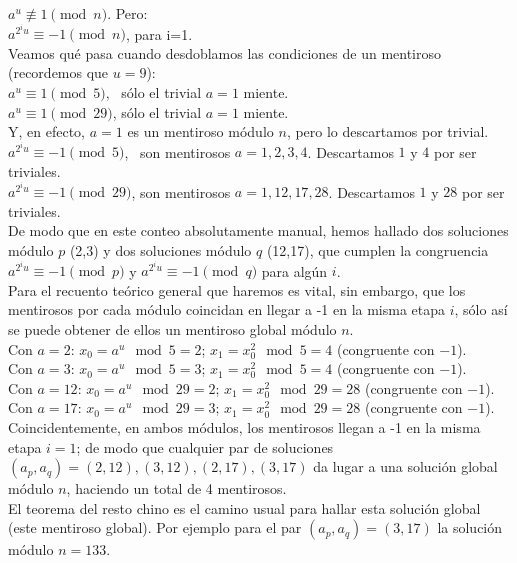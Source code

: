 \begin{ejemplo}
$a^u \nequiv 1 \pmod n$. Pero:\\
$a^{2^{i}u} \equiv -1 \pmod n$, para i=1. \\
Veamos qué pasa cuando desdoblamos las condiciones de un mentiroso (recordemos que $u=9$): \\
$a^u \equiv 1 \pmod 5$, \, sólo el trivial $a=1$ miente.\\
$a^u \equiv 1 \pmod {29}$, sólo el trivial $a=1$ miente.\\
Y, en efecto, $a=1$ es un mentiroso módulo $n$, pero lo descartamos por trivial. \\
$a^{2^{i}u} \equiv -1 \pmod 5$, \, son mentirosos $a=1,2,3,4$. Descartamos $1$ y $4$ por ser triviales.\\
$a^{2^{i}u} \equiv -1 \pmod {29}$, son mentirosos $a=1,12,17,28$. Descartamos $1$ y $28$ por ser triviales. \\
De modo que en este conteo absolutamente manual, hemos hallado dos soluciones módulo $p$ (2,3) y dos soluciones módulo $q$ (12,17), que cumplen la congruencia $a^{2^{i}u} \equiv -1 \pmod p$ y $a^{2^{i}u} \equiv -1 \pmod q$ para algún $i$. \\
Para el recuento teórico general que haremos es vital, sin embargo, que los mentirosos por cada módulo coincidan en llegar a -1 en la misma etapa $i$, sólo así se puede obtener de ellos un mentiroso global módulo $n$. \\
Con $a=2$: $x_0=a^u \mod 5= 2$; $x_1= x_0^2 \mod 5 = 4$ (congruente con $-1$). \\
Con $a=3$: $x_0=a^u \mod 5= 3$; $x_1= x_0^2 \mod 5 = 4$ (congruente con $-1$). \\
Con $a=12$: $x_0=a^u \mod 29= 2$; $x_1= x_0^2 \mod 29 = 28$ (congruente con $-1$). \\
Con $a=17$: $x_0=a^u \mod 29= 3$; $x_1= x_0^2 \mod 29 = 28$ (congruente con $-1$). \\
Coincidentemente, en ambos módulos, los mentirosos llegan a -1 en la misma etapa $i=1$; de modo que cualquier par de soluciones $(a_p,a_q)=(2,12), (3,12), (2,17), (3,17)$ da lugar a una solución global módulo $n$, haciendo un total de 4 mentirosos. \\
El teorema del resto chino es el camino usual para hallar esta solución global (este mentiroso global).
Por ejemplo para el par $(a_p,a_q)=(3,17)$ la solución módulo $n=133$.
\end{ejemplo}

